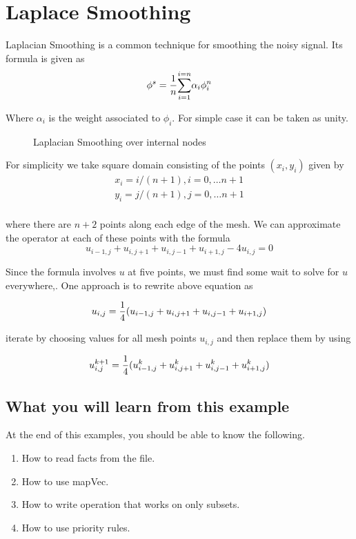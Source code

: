 \section { Laplace Smoothing }
Laplacian Smoothing is a common technique for smoothing the noisy signal.
Its formula is given as 
\begin{equation}
\phi^s = { 1 \over n} { \sum_{i=1}^{i=n} } \alpha_i \phi_i^n
\end{equation}

Where $\alpha_i$ is the weight associated to $\phi_i$. For simple case it can be taken
as unity.

\begin{figure}[h]
\vspace{2.96in}\caption { Laplacian Smoothing over internal nodes }
\end{figure}

For simplicity we take square domain  consisting of the points $(x_i, y_i)$ given by
\begin{eqnarray}
x_i =  i / (n+1), i = 0, \dots n+1  \\
y_i =  j / (n+1), j = 0, \dots n+1  \\
\end{eqnarray}

where there are $n+2$ points along each edge of the mesh. We can approximate the 
operator at each of these points with the formula
\begin{equation}
{u_{i-1,j} + u_{i,j+1} + u_{i,j-1} + u_{i+1,j} - 4 u_{i,j}} = 0
\end{equation}

Since the formula involves $u$ at five points, we must find some wait to solve
for $u$ everywhere,. One approach is to rewrite above equation as 

\begin{equation}
u_{i,j} = {1 \over 4}(u_{i-1,j} + u_{i,j+1} + u_{i,j-1} + u_{i+1,j})
\end{equation}

iterate by choosing values for all mesh points $u_{i,j}$ and then replace them by
using

\begin{equation}
u_{i,j}^{k+1} = {1 \over 4}(u_{i-1,j}^k + u_{i,j+1}^k + u_{i,j-1}^k + u_{i+1,j}^k)
\end{equation}

\subsection { What you will learn from this example }
At the end of this examples, you should be able to know the following.
\begin{enumerate}
\item How to read facts from the file.
\item How to use mapVec.
\item How to write operation that works on only subsets.
\item How to use priority rules.
\end{enumerate}

